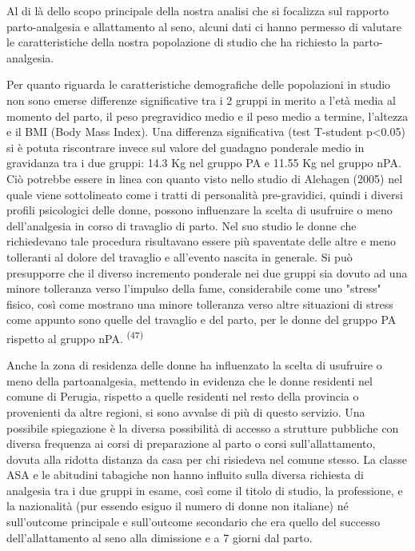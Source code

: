 \documentclass[]{article}
\begin{document}
Al di là dello scopo principale della nostra analisi che si focalizza
sul rapporto parto-analgesia e allattamento al seno, alcuni dati ci
hanno permesso di valutare le caratteristiche della nostra popolazione
di studio che ha richiesto la parto-analgesia.

Per quanto riguarda le caratteristiche demografiche delle popolazioni in
studio non sono emerse differenze significative tra i 2 gruppi in merito
a l'età media al momento del parto, il peso pregravidico medio e il peso
medio a termine, l'altezza e il BMI (Body Mass Index). Una differenza
significativa (test T-student p\textless{}0.05) si è potuta riscontrare
invece sul valore del guadagno ponderale medio in gravidanza tra i due
gruppi: 14.3 Kg nel gruppo PA e 11.55 Kg nel gruppo nPA. Ciò potrebbe
essere in linea con quanto visto nello studio di Alehagen (2005) nel
quale viene sottolineato come i tratti di personalità pre-gravidici,
quindi i diversi profili psicologici delle donne, possono influenzare la
scelta di usufruire o meno dell'analgesia in corso di travaglio di
parto. Nel suo studio le donne che richiedevano tale procedura
risultavano essere più spaventate delle altre e meno tolleranti al
dolore del travaglio e all'evento nascita in generale. Si può
presupporre che il diverso incremento ponderale nei due gruppi sia
dovuto ad una minore tolleranza verso l'impulso della fame,
considerabile come uno "stress" fisico, così come mostrano una minore
tolleranza verso altre situazioni di stress come appunto sono quelle del
travaglio e del parto, per le donne del gruppo PA rispetto al gruppo
nPA. \textsuperscript{(47) }

Anche la zona di residenza delle donne ha influenzato la scelta di
usufruire o meno della partoanalgesia, mettendo in evidenza che le donne
residenti nel comune di Perugia, rispetto a quelle residenti nel resto
della provincia o provenienti da altre regioni, si sono avvalse di più
di questo servizio. Una possibile spiegazione è la diversa possibilità
di accesso a strutture pubbliche con diversa frequenza ai corsi di
preparazione al parto o corsi sull'allattamento, dovuta alla ridotta
distanza da casa per chi risiedeva nel comune stesso. La classe ASA e le
abitudini tabagiche non hanno influito sulla diversa richiesta di
analgesia tra i due gruppi in esame, così come il titolo di studio, la
professione, e la nazionalità (pur essendo esiguo il numero di donne non
italiane) né sull'outcome principale e sull'outcome secondario che era
quello del successo dell'allattamento al seno alla dimissione e a 7
giorni dal parto.
\end{document}
